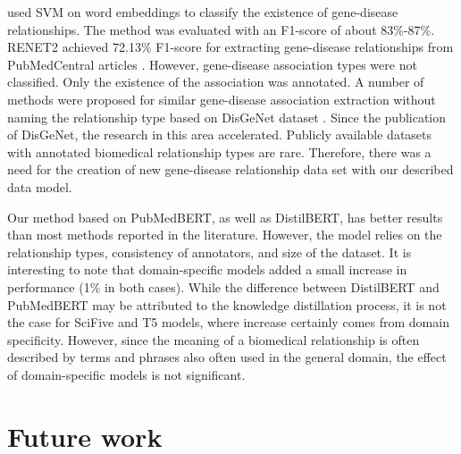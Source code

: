 \documentclass[final,12pt,3p,times,twocolumn,authoryear]{elsarticle}
\begin{document}
\cite{bhasuran2018automatic} used SVM on word embeddings to classify the existence of gene-disease relationships. The method was evaluated with an F1-score of about 83\%-87\%. RENET2 achieved 72.13\% F1-score for extracting gene-disease relationships from PubMedCentral articles \citep{su2021renet2}. However, gene-disease association types were not classified. Only the existence of the association was annotated. A number of methods were proposed for similar gene-disease association extraction without naming the relationship type based on DisGeNet dataset \citep{pinero2016disgenet,hebbar2021covidbert,parmar2020biomedical}. Since the publication of DisGeNet, the research in this area accelerated. Publicly available datasets with annotated biomedical relationship types are rare. Therefore, there was a need for the creation of new gene-disease relationship data set with our described data model. 

Our method based on PubMedBERT, as well as DistilBERT, has better results than most methods reported in the literature. However, the model relies on the relationship types, consistency of annotators, and size of the dataset. It is interesting to note that domain-specific models added a small increase in performance (1\% in both cases). While the difference between DistilBERT and PubMedBERT may be attributed to the knowledge distillation process, it is not the case for SciFive and T5 models, where increase certainly comes from domain specificity. However, since the meaning of a biomedical relationship is often described by terms and phrases also often used in the general domain, the effect of domain-specific models is not significant. 





\section{Future work}
\end{document}
